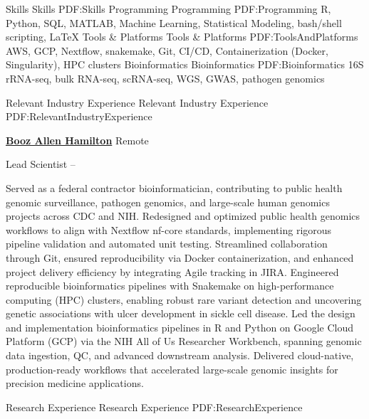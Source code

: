 \documentclass[letterpaper,MMMyyyy,nonstopmode]{simpleresumecv}
\begin{document}
\begin{Body}

\Section
{Skills}
{Skills}
{PDF:Skills}
\BigGap
\SubSection
{Programming}
{Programming}
{PDF:Programming}
\Entry
R, Python, SQL, MATLAB, Machine Learning, Statistical Modeling, bash/shell scripting, {\LaTeX}
\Gap
\SubSection
{Tools \& Platforms}
{Tools \& Platforms}
{PDF:ToolsAndPlatforms}
\Entry
AWS, GCP, Nextflow, snakemake, Git, CI/CD, Containerization (Docker, Singularity), HPC clusters
\Gap
\SubSection
{Bioinformatics}
{Bioinformatics}
{PDF:Bioinformatics}
\Entry
16S rRNA-seq, bulk RNA-seq, scRNA-seq, WGS, GWAS, pathogen genomics

\Section
{Relevant Industry\newline
Experience}
{Relevant Industry Experience}
{PDF:RelevantIndustryExperience}

\Entry
\href{https://www.boozallen.com/}
{\textbf{Booz Allen Hamilton}}
Remote

\Gap
\BulletItem
Lead Scientist
\hfill
{} --
\begin{Detail}
\SubBulletItem
Served as a federal contractor bioinformatician, contributing to public health genomic surveillance, pathogen genomics, and large-scale human genomics projects across CDC and NIH.
\SubBulletItem
Redesigned and optimized public health genomics workflows to align with Nextflow nf-core standards, implementing rigorous pipeline validation and automated unit testing. Streamlined collaboration through Git, ensured reproducibility via Docker containerization, and enhanced project delivery efficiency by integrating Agile tracking in JIRA.
\SubBulletItem
Engineered reproducible bioinformatics pipelines with Snakemake on high-performance computing \text(HPC\text) clusters, enabling robust rare variant detection and uncovering genetic associations with ulcer development in sickle cell disease.
\SubBulletItem
Led the design and implementation bioinformatics pipelines in R and Python on Google Cloud Platform (GCP) via the NIH All of Us Researcher Workbench, spanning genomic data ingestion, QC, and advanced downstream analysis. Delivered cloud-native, production-ready workflows that accelerated large-scale genomic insights for precision medicine applications.
\end{Detail}


\Section
{Research Experience}
{Research Experience}
{PDF:ResearchExperience}


\end{Body}
\end{document}
